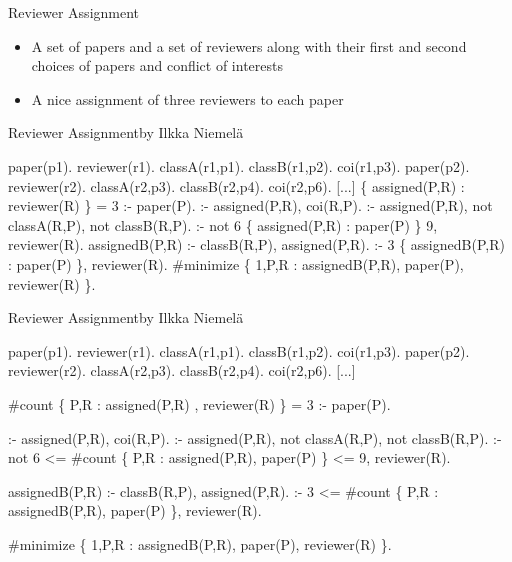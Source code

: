 \begin{frame}{Reviewer Assignment}

  \bigskip

  \begin{itemize}
  \item<1-> 
    A set of papers and a set of reviewers along with their first and second choices of papers and conflict of interests
    \medskip
  \item<1-> 
    A \alert<2>{nice} assignment of three reviewers to each paper
  \end{itemize}

\end{frame}
\begin{frame}[fragile,shrink=1]{Reviewer Assignment}{by Ilkka Niemelä}
\begin{semiverbatim}
paper(p1).  reviewer(r1). classA(r1,p1). classB(r1,p2). coi(r1,p3).
paper(p2).  reviewer(r2). classA(r2,p3). classB(r2,p4). coi(r2,p6).
[...]
\pause
\{ assigned(P,R) : reviewer(R) \} = 3 :-  paper(P).
\pause
 :- assigned(P,R), coi(R,P).
 :- assigned(P,R), not classA(R,P), not classB(R,P).
 :- not 6 \{ assigned(P,R) : paper(P) \} 9, reviewer(R).
\pause
assignedB(P,R) :-  classB(R,P), assigned(P,R).
 :- 3 \{ assignedB(P,R) : paper(P) \}, reviewer(R).
\pause
#minimize \{ 1,P,R : assignedB(P,R), paper(P), reviewer(R) \}.



\end{semiverbatim}
\end{frame}
\begin{frame}[fragile,shrink=1]{Reviewer Assignment}{by Ilkka Niemelä}
\begin{semiverbatim}
paper(p1).  reviewer(r1). classA(r1,p1). classB(r1,p2). coi(r1,p3).
paper(p2).  reviewer(r2). classA(r2,p3). classB(r2,p4). coi(r2,p6).
[...]

\alert<2>{#count} \{ \alert<2>{P,R :} assigned(P,R) \alert<2>{,} reviewer(R) \} = 3 :-  paper(P).

 :- assigned(P,R), coi(R,P).
 :- assigned(P,R), not classA(R,P), not classB(R,P).
 :- not 6 \alert<2>{<= #count} \{ \alert<2>{P,R :} assigned(P,R)\alert<2>{,} paper(P) \} \alert<2>{<= 9}, reviewer(R).

assignedB(P,R) :-  classB(R,P), assigned(P,R).
 :- 3 \alert<2>{<= #count} \{ \alert<2>{P,R :} assignedB(P,R), paper(P) \}, reviewer(R).

#minimize \{ 1,P,R : assignedB(P,R), paper(P), reviewer(R) \}.



\end{semiverbatim}
\end{frame}
%
